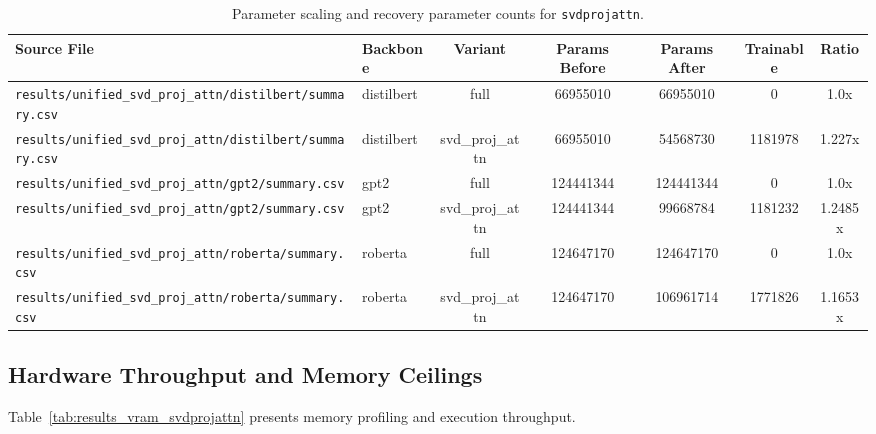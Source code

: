 \begin{table}[t]
\centering
\small
\begin{tabular}{llccccc}
\toprule
\textbf{Source File} & \textbf{Backbone} & \textbf{Variant} & \textbf{Params Before} & \textbf{Params After} & \textbf{Trainable} & \textbf{Ratio} \\
\midrule
\texttt{results/unified\_svd\_proj\_attn/distilbert/summary.csv} & distilbert & full & 66955010 & 66955010 & 0 & 1.0x \\
\texttt{results/unified\_svd\_proj\_attn/distilbert/summary.csv} & distilbert & svd\_proj\_attn & 66955010 & 54568730 & 1181978 & 1.227x \\
\texttt{results/unified\_svd\_proj\_attn/gpt2/summary.csv} & gpt2 & full & 124441344 & 124441344 & 0 & 1.0x \\
\texttt{results/unified\_svd\_proj\_attn/gpt2/summary.csv} & gpt2 & svd\_proj\_attn & 124441344 & 99668784 & 1181232 & 1.2485x \\
\texttt{results/unified\_svd\_proj\_attn/roberta/summary.csv} & roberta & full & 124647170 & 124647170 & 0 & 1.0x \\
\texttt{results/unified\_svd\_proj\_attn/roberta/summary.csv} & roberta & svd\_proj\_attn & 124647170 & 106961714 & 1771826 & 1.1653x \\
\bottomrule
\end{tabular}
\caption{Parameter scaling and recovery parameter counts for \texttt{svdprojattn}.}
\label{tab:results_params_svdprojattn}
\end{table}

\subsection{Hardware Throughput and Memory Ceilings}
Table~\ref{tab:results_vram_svdprojattn} presents memory profiling and execution throughput.

